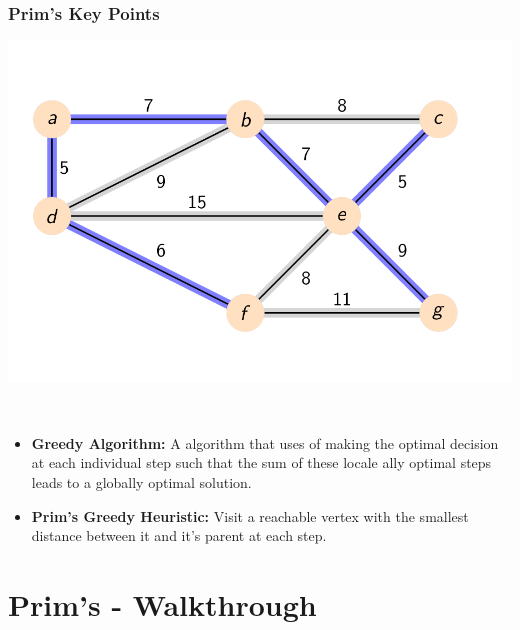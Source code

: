\documentclass{beamer}
\begin{document}
\begin{frame}[fragile]
    \frametitle{Prim's Key Points}
    \begin{minipage}{0.49\textwidth}
        \centering
        \includegraphics[width=\textwidth]{./imgs/graph-1.png}
    \end{minipage}
    \hfill
    \begin{minipage}{0.49\textwidth}
        \centering
        
    \end{minipage}
    ~\\
    \begin{itemize}
        \item \textbf{Greedy Algorithm: } A algorithm that uses of making the optimal decision at each individual step such that the sum of these locale ally optimal steps leads to a globally optimal solution.
        \item \textbf{Prim's Greedy Heuristic: } Visit a reachable vertex with the smallest distance between it and it's parent at each step.
    \end{itemize}
\end{frame}


\section{Prim's - Walkthrough}
\end{document}
